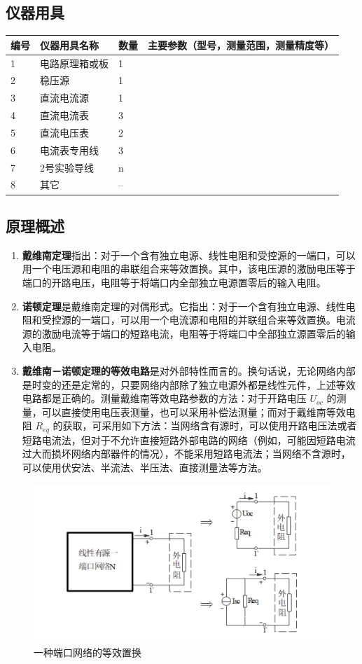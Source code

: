 \documentclass[dvipsnames, svgnames,a4paper,11pt]{article}
\begin{document}
	\subsection{仪器用具}
	\begin{table}[htbp]
		\centering
		\renewcommand\arraystretch{1.6}
		\begin{tabular}{|p{}|p{}|p{}|p{}|}
			\hline
			编号& 仪器用具名称 & 数量 &  主要参数（型号，测量范围，测量精度等） \\
			\hline
			1& 电路原理箱或板 & 1 &  \\
			\hline
			2& 稳压源 & 1 &  \\
			\hline
			3& 直流电流源 & 1 &  \\
			\hline
			4& 直流电流表 & 3 &  \\
			\hline
			5& 直流电压表 & 2 &  \\
			\hline
			6& 电流表专用线 & 3 &  \\
			\hline
			7& 2号实验导线 & n &  \\
			\hline
			8& 其它 & -- &  \\
			\hline
		\end{tabular}
	\end{table}
	
	\subsection{原理概述}
	\begin{enumerate}
	\item \textbf{戴维南定理}指出：对于一个含有独立电源、线性电阻和受控源的一端口，可以用一个电压源和电阻的串联组合来等效置换。其中，该电压源的激励电压等于端口的开路电压，电阻等于将端口内全部独立电源置零后的输入电阻。
	\item \textbf{诺顿定理}是戴维南定理的对偶形式。它指出：对于一个含有独立电源、线性电阻和受控源的一端口，可以用一个电流源和电阻的并联组合来等效置换。电流源的激励电流等于端口的短路电流，电阻等于将端口中全部独立源置零后的输入电阻。
	\item \textbf{戴维南－诺顿定理的等效电路}是对外部特性而言的。换句话说，无论网络内部是时变的还是定常的，只要网络内部除了独立电源外都是线性元件，上述等效电路都是正确的。测量戴维南等效电路参数的方法：对于开路电压 $U_{oc}$ 的测量，可以直接使用电压表测量，也可以采用补偿法测量；而对于戴维南等效电阻 $R_{eq}$ 的获取，可采用如下方法：当网络含有源时，可以使用开路电压法或者短路电流法，但对于不允许直接短路外部电路的网络（例如，可能因短路电流过大而损坏网络内部器件的情况），不能采用短路电流法；当网络不含源时，可以使用伏安法、半流法、半压法、直接测量法等方法。
\end{enumerate}
\begin{figure}[H]
	\centering
	\includegraphics[width=0.4\linewidth]{images/一种端口}
	\caption{一种端口网络的等效置换}
	\label{fig:}
\end{figure}
	
\end{document}
